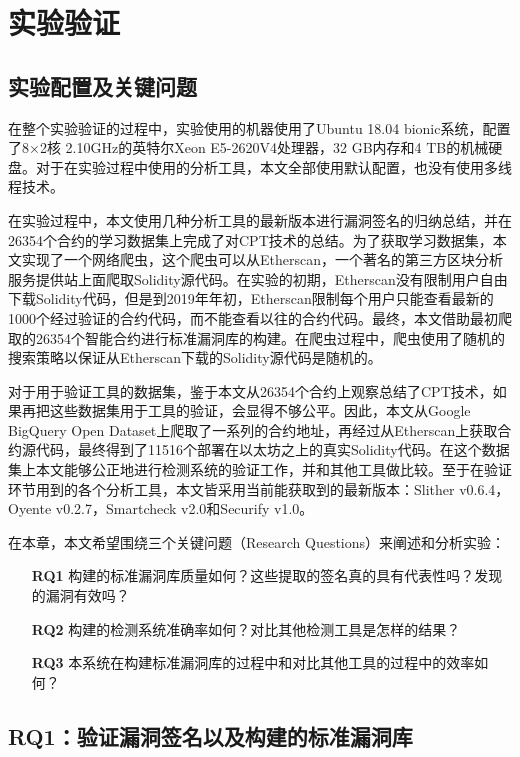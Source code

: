 \chapter{实验验证}

\section{实验配置及关键问题}

在整个实验验证的过程中，实验使用的机器使用了Ubuntu 18.04 bionic系统，配置了8$\times$2核 2.10GHz的英特尔Xeon E5-2620V4处理器，32 GB内存和4 TB的机械硬盘。对于在实验过程中使用的分析工具，本文全部使用默认配置，也没有使用多线程技术。

在实验过程中，本文使用几种分析工具的最新版本进行漏洞签名的归纳总结，并在26354个合约的学习数据集上完成了对CPT技术的总结。为了获取学习数据集，本文实现了一个网络爬虫，这个爬虫可以从Etherscan，一个著名的第三方区块分析服务提供站上面爬取Solidity源代码。在实验的初期，Etherscan没有限制用户自由下载Solidity代码，但是到2019年年初，Etherscan限制每个用户只能查看最新的1000个经过验证的合约代码，而不能查看以往的合约代码。最终，本文借助最初爬取的26354个智能合约进行标准漏洞库的构建。在爬虫过程中，爬虫使用了随机的搜索策略以保证从Etherscan下载的Solidity源代码是随机的。

对于用于验证工具的数据集，鉴于本文从26354个合约上观察总结了CPT技术，如果再把这些数据集用于工具的验证，会显得不够公平。因此，本文从Google BigQuery Open Dataset上爬取了一系列的合约地址，再经过从Etherscan上获取合约源代码，最终得到了11516个部署在以太坊之上的真实Solidity代码。在这个数据集上本文能够公正地进行检测系统的验证工作，并和其他工具做比较。至于在验证环节用到的各个分析工具，本文皆采用当前能获取到的最新版本：Slither v0.6.4，Oyente v0.2.7，Smartcheck v2.0和Securify v1.0。

在本章，本文希望围绕三个关键问题（Research Questions）来阐述和分析实验：
\begin{itemize}
  \item[\textbf{RQ1}] 构建的标准漏洞库质量如何？这些提取的签名真的具有代表性吗？发现的漏洞有效吗？
  \item[\textbf{RQ2}] 构建的检测系统准确率如何？对比其他检测工具是怎样的结果？
  \item[\textbf{RQ3}] 本系统在构建标准漏洞库的过程中和对比其他工具的过程中的效率如何？
\end{itemize}

\section{RQ1：验证漏洞签名以及构建的标准漏洞库}

